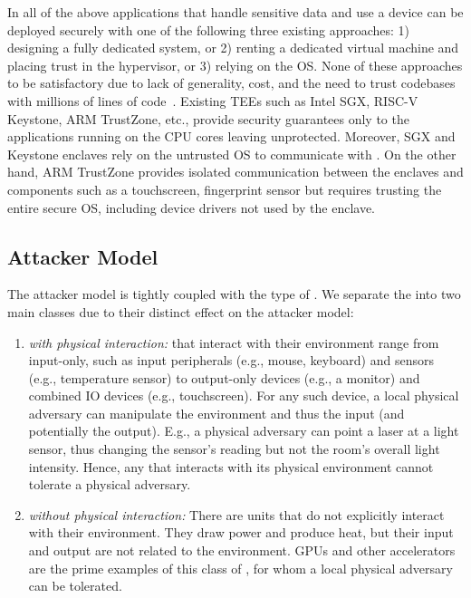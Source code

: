 In all of the above applications that handle sensitive data and use a \sphw device can be deployed securely with one of the following three existing approaches: 1) designing a fully dedicated system, or 2) renting a dedicated virtual machine and placing trust in the hypervisor, or 3) relying on the OS. None of these approaches to be satisfactory due to lack of generality, cost, and the need to trust codebases with millions of lines of code~\cite{torvalds2020linux,barham2003xen}. Existing TEEs such as Intel SGX, RISC-V Keystone, ARM TrustZone, etc., provide security guarantees only to the applications running on the CPU cores leaving \sphw unprotected. Moreover, SGX and Keystone enclaves rely on the untrusted OS to communicate with \sphw. On the other hand, ARM TrustZone provides isolated communication between the enclaves and components such as a touchscreen, fingerprint sensor but requires trusting the entire secure OS, including device drivers not used by the enclave. 


\subsection{Attacker Model}
\label{pie:sec:problemStatement:attackerModel}

The attacker model is tightly coupled with the type of \sphw. We separate the \sphw into two main classes due to their distinct effect on the attacker model: 

\begin{enumerate}
\item \emph{\Sphw with physical interaction:}
\Sphw that interact with their environment range from input-only, such as input peripherals (e.g., mouse, keyboard) and sensors (e.g., temperature sensor) to output-only devices (e.g., a monitor) and combined IO devices (e.g., touchscreen). For any such device, a local physical adversary can manipulate the environment and thus the input (and potentially the output). E.g., a physical adversary can point a laser at a light sensor, thus changing the sensor's reading but not the room's overall light intensity. Hence, any \sphw that interacts with its physical environment cannot tolerate a physical adversary.

\item \emph{\Sphw without physical interaction:}
There are \sphw units that do not explicitly interact with their environment. They draw power and produce heat, but their input and output are not related to the environment. GPUs and other accelerators are the prime examples of this class of \sphw, for whom a local physical adversary can be tolerated. 
\end{enumerate}

